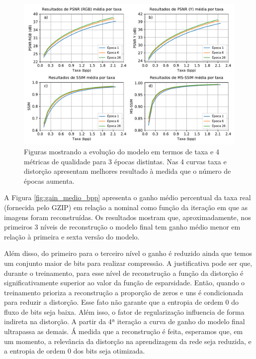 \begin{figure}
	\centering
	\includegraphics[width=1\textwidth]{figuras/result_3ep.pdf}
	\caption[Curvas de qualidade por taxa em 3 épocas distintas]{Figuras mostrando a evolução do modelo em termos de taxa e 4 métricas de qualidade para 3 épocas distintas. Nas 4 curvas taxa e distorção apresentam melhores resultado à medida que o número de épocas aumenta.}  	
	\label{fig:metricas_3ep}
\end{figure}

A Figura \ref{fig:gain_medio_bpp} apresenta o ganho médio percentual da taxa real (fornecida pelo GZIP) em relação a nominal como função da iteração em que as imagens foram reconstruídas. Os resultados mostram que, aproximadamente, nos primeiros 3 níveis de reconstrução o modelo final tem ganho médio menor em relação à primeira e sexta versão do modelo.  

Além disso, do primeiro para o terceiro nível o ganho é reduzido ainda que temos um conjunto maior de bits para realizar compressão.  
A justificativa pode ser que, durante o treinamento, para esse nível de reconstrução a função da distorção é significativamente superior ao valor da função de esparsidade. Então, quando o treinamento prioriza a reconstrução a proporção de zeros e uns é condicionada para reduzir a distorção. Esse fato não garante que a entropia de ordem 0 do fluxo de bits seja baixa. Além isso, o fator de regularização influencia de forma indireta na distorção.
A partir da 4ª iteração a curva de ganho do modelo final ultrapassa as demais. Á medida que a reconstrução é feita, esperamos que, em um momento, a relevância da distorção na aprendizagem da rede seja reduzida, e a entropia de ordem 0 dos bits seja otimizada. 



